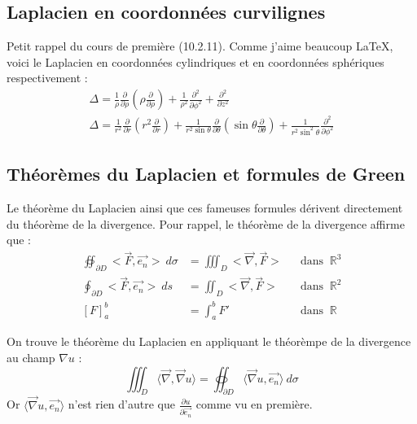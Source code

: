 \documentclass[11pt, a4paper, openany]{book}
\begin{document}
				\subsection{Laplacien en coordonnées curvilignes}
				Petit rappel du cours de première (10.2.11). Comme j'aime beaucoup \LaTeX, voici le Laplacien
				en coordonnées cylindriques et en coordonnées sphériques respectivement :
				\begin{eqnarray}
					\Delta = \frac{1}{\rho}\frac{\partial}{\partial\rho}\left(\rho\frac{\partial}{\partial\rho}\right)
					+\frac{1}{\rho^2}\frac{\partial^2}{\partial\phi^2}+ \frac{\partial^2}{\partial z^2}\\
					\Delta = \frac{1}{r^2}\frac{\partial}{\partial r}\left(r^2\frac{\partial}{\partial r}\right) +
					\frac{1}{r^2\sin\theta}\frac{\partial}{\partial\theta}\left(\sin\theta\frac{\partial}{\partial
						\theta}\right) + \frac{1}{r^2\sin^2\theta}\frac{\partial^2}{\partial\phi^2}
				\end{eqnarray}
																		
				\subsection{Théorèmes du Laplacien et formules de Green}
				Le théorème du Laplacien ainsi que ces fameuses formules dérivent directement du théorème de
				la divergence. Pour rappel, le théorème de la divergence affirme que :
				\begin{equation}
					\begin{array}{lll}
						\oiint_{\partial D} <\vec{F},\vec{e_n}>\ d\sigma & = \iiint_D <\vec{\nabla},\vec{F}> & \ \ \text{                    
						dans }\ \mathbb{R}^3\\
						\oint_{\partial D}  <\vec{F},\vec{e_n}>\ ds      & = \iint_D <\vec{\nabla},\vec{F}>  & \ \ \text{                    
						dans }\ \mathbb{R}^2\\
						\left[F\right]^b_a                               & = \int_a^b F'                     & \ \ \text{ dans }\ \mathbb{R} 
					\end{array}
				\end{equation}
																		
				On trouve le théorème du Laplacien en appliquant le théorèmpe de la divergence au champ 
				$\nabla u$ :
				\begin{equation}
					\iiint_D \langle\vec{\nabla},\vec{\nabla}u\rangle = \oiint_{\partial D} \langle\vec{\nabla}
					u, \vec{e_n}\rangle\ d\sigma
				\end{equation}
				Or $\langle\vec{\nabla}	u, \vec{e_n}\rangle$ n'est rien d'autre que $\frac{\partial u}{\partial
					\vec{e_n}}$ comme vu en première.\\
																		
\end{document}
